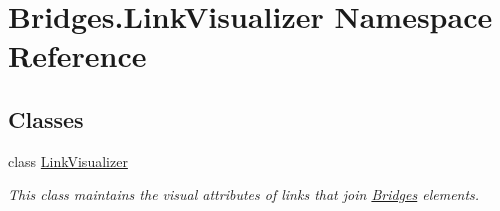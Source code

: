 \hypertarget{namespace_bridges_1_1_link_visualizer}{}\section{Bridges.\+Link\+Visualizer Namespace Reference}
\label{namespace_bridges_1_1_link_visualizer}
\subsection*{Classes}
\begin{DoxyCompactItemize}
\item 
class \hyperlink{class_bridges_1_1_link_visualizer_1_1_link_visualizer}{Link\+Visualizer}
\begin{DoxyCompactList}\small\item\em This class maintains the visual attributes of links that join \hyperlink{namespace_bridges_1_1_bridges}{Bridges} elements. \end{DoxyCompactList}\end{DoxyCompactItemize}
